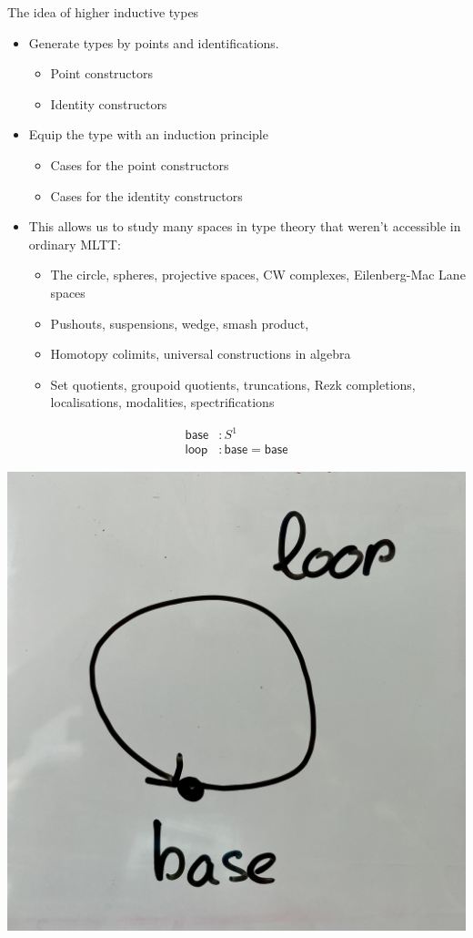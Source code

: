 \documentclass[handout]{beamer}
\newcommand{\sphere}[1]{S^{#1}}
\newcommand{\baseS}{\mathsf{base}}
\newcommand{\loopS}{\mathsf{loop}}
\begin{document}
\begin{frame}
  The idea of higher inductive types
  \begin{itemize}
  \item Generate types by points and identifications.
    \begin{itemize}
    \item Point constructors
    \item Identity constructors
    \end{itemize}\pause
  \item Equip the type with an induction principle
    \begin{itemize}
    \item Cases for the point constructors
    \item Cases for the identity constructors
    \end{itemize}\pause 
  \item This allows us to study many spaces in type theory that weren't accessible in ordinary MLTT:
    \begin{itemize}
    \item The circle, spheres, projective spaces, CW complexes, Eilenberg-Mac Lane spaces
    \item Pushouts, suspensions, wedge, smash product, 
    \item Homotopy colimits, universal constructions in algebra
    \item Set quotients, groupoid quotients, truncations, Rezk completions, localisations, modalities, spectrifications
    \end{itemize}
  \end{itemize}
\end{frame}

\begin{frame}
  \begin{align*}
    \baseS & : \sphere{1} \\
    \loopS & : \baseS=\baseS
  \end{align*}
  \begin{center}
    \includegraphics[width=.3\textwidth]{circle}
  \end{center}
\end{frame}
\end{document}
